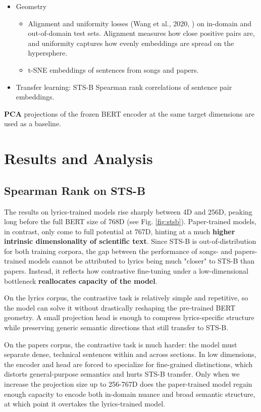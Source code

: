 \documentclass{article}
\begin{document}
\begin{itemize}
\item Geometry
\begin{itemize}
		\item Alignment and uniformity losses (Wang et al., 2020, \cite{wang2020}) on in-domain
				and out-of-domain test sets. Alignment measures how close positive pairs are, and
				uniformity captures how evenly embeddings are spread on the hypersphere.
		\item t-SNE embeddings of sentences from songs and papers.
\end{itemize}
\item Transfer learning: STS-B Spearman rank correlations of sentence pair embeddings.
\end{itemize}

\textbf{PCA} projections of the frozen BERT encoder at the same target dimensions are
used as a baseline.

\section{Results and Analysis}

\subsection{Spearman Rank on STS-B}
The results on lyrics-trained models rise sharply between 4D and 256D, peaking long
before the full BERT size of 768D (see Fig. \ref{fig:stsb}). Paper-trained models, in
contrast, only come to full potential at 767D, hinting at a much \textbf{higher intrinsic
dimensionality of scientific text}. Since STS-B is out-of-distribution for both training
corpora, the gap between the performance of songs- and papers-trained models cannot be
attributed to lyrics being much "closer" to STS-B than papers. Instead, it reflects how
contrastive fine-tuning under a low-dimensional bottleneck \textbf{reallocates capacity
of the model}.

On the lyrics corpus, the contrastive task is relatively simple and repetitive, so the
model can solve it without drastically reshaping the pre-trained BERT geometry. A small
projection head is enough to compress lyrics-specific structure while preserving generic
semantic directions that still transfer to STS-B.

On the papers corpus, the contrastive task is much harder: the model must separate dense,
technical sentences within and across sections. In low dimensions, the encoder and head
are forced to specialize for fine-grained distinctions, which distorts general-purpose
semantics and hurts STS-B transfer. Only when we increase the projection size up to
256-767D does the paper-trained model regain enough capacity to encode both in-domain
nuance and broad semantic structure, at which point it overtakes the lyrics-trained model.
\end{document}
